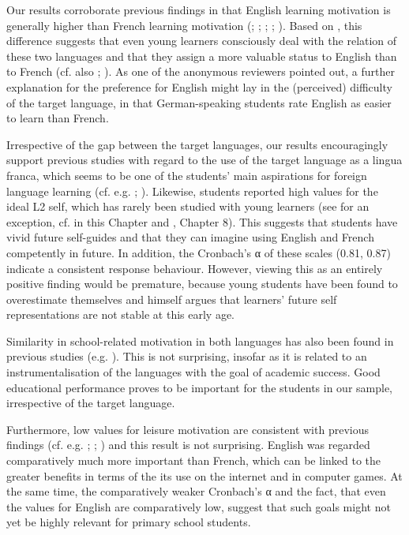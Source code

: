 \documentclass[output=paper]{langsci/langscibook}
\begin{document}
Our results corroborate previous findings in that English learning motivation is generally higher than French learning motivation (\citealt{Stoeckli2004}; \citealt{Heinzmann2010,Heinzmann2013}; \citealt{PeyerEtAl2016}; \citealt{BruehwilerLePapeRacine2017}; \citealt{PfenningerSingleton2017}). Based on \citet{Busse2017}, this difference suggests that even young learners consciously deal with the relation of these two languages and that they assign a more valuable status to English than to French (cf. also \citealt{Ushioda2017}; \citealt{BuylHousen2014}). As one of the anonymous reviewers pointed out, a further explanation for the preference for English might lay in the (perceived) difficulty of the target language, in that German-speaking students rate English as easier to learn than French.

Irrespective of the gap between the target languages, our results encouragingly support previous studies with regard to the use of the target language as a lingua franca, which seems to be one of the students’ main aspirations for foreign language learning (cf. e.g. \citealt{SchaerBader2003}; \citealt{Stoeckli2004}). Likewise, students reported high values for the ideal L2 self, which has rarely been studied with young learners (see \citealt{Henry2009} for an exception, cf.  in this Chapter and , Chapter 8). This suggests that students have vivid future self-guides and that they can imagine using English and French competently in future. In addition, the Cronbach’s α of these scales (0.81, 0.87) indicate a consistent response behaviour. However, viewing this as an entirely positive finding would be premature, because young students have been found to overestimate themselves and \citet[38]{Doernyei2009} himself argues that learners’ future self representations are not stable at this early age.

Similarity in school-related motivation in both languages has also been found in previous studies (e.g. \citealt{Stoeckli2004}). This is not surprising, insofar as it is related to an instrumentalisation of the languages with the goal of academic success. Good educational performance proves to be important for the students in our sample, irrespective of the target language.

Furthermore, low values for leisure motivation are consistent with previous findings (cf. e.g. \citealt{SchaerBader2003}; \citealt{Stoeckli2004}; \citealt{Heinzmann2013}) and this result is not surprising. English was regarded comparatively much more important than French, which can be linked to the greater benefits in terms of the its use on the internet and in computer games. At the same time, the comparatively weaker Cronbach’s α and the fact, that even the values for English are comparatively low, suggest that such goals might not yet be highly relevant for primary school students.
\end{document}
